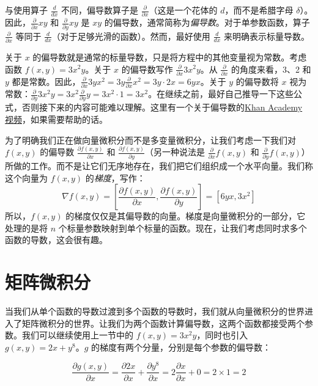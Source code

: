 \documentclass[11pt]{article}
\begin{document}
与使用算子 $\frac{d}{dx}$ 不同，偏导数算子是 $\frac{\partial}{\partial x}$（这是一个花体的 $d$，而不是希腊字母 $\delta$）。因此，$\frac{\partial }{\partial x}xy$ 和 $\frac{\partial }{\partial y}xy$ 是 $xy$ 的偏导数，通常简称为{\em 偏导数}。对于单参数函数，算子 $\frac{\partial}{\partial x}$ 等同于 $\frac{d}{dx}$（对于足够光滑的函数）。然而，最好使用 $\frac{d}{dx}$ 来明确表示标量导数。

关于 $x$ 的偏导数就是通常的标量导数，只是将方程中的其他变量视为常数。考虑函数 $f(x, y) = 3x^2y$。关于 $x$ 的偏导数写作 $\frac{\partial}{\partial x} 3x^2y$。从 $\frac{\partial}{\partial x}$ 的角度来看，3、2 和 $y$ 都是常数。因此，$\frac{\partial}{\partial x} 3yx^2 = 3y \frac{\partial}{\partial x} x^2 = 3y \cdot 2x = 6yx$。关于 $y$ 的偏导数将 $x$ 视为常数：$\frac{\partial}{\partial y} 3x^2y = 3x^2 \frac{\partial}{\partial y} y = 3x^2 \cdot 1 = 3x^2$。在继续之前，最好自己推导一下这些公式，否则接下来的内容可能难以理解。这里有一个关于偏导数的\href{https://www.khanacademy.org/math/multivariable-calculus/multivariable-derivatives/partial-derivative-and-gradient-articles/a/introduction-to-partial-derivatives}{Khan Academy 视频}，如果需要帮助的话。

为了明确我们正在做向量微积分而不是多变量微积分，让我们考虑一下我们对 $f(x, y)$ 的偏导数 $\frac{\partial f(x, y)}{\partial x}$ 和 $\frac{\partial f(x, y)}{\partial y}$（另一种说法是 $\frac{\partial}{\partial x}f(x, y)$ 和 $\frac{\partial }{\partial y}f(x, y)$）所做的工作。而不是让它们无序地存在，我们把它们组织成一个水平向量。我们称这个向量为 $f(x, y)$ 的{\em 梯度}，写作：
\[
\nabla f(x, y) = \left[ \frac{\partial f(x, y)}{\partial x}, \frac{\partial f(x, y)}{\partial y} \right] = [6yx, 3x^2]
\]
所以，$f(x, y)$ 的梯度仅仅是其偏导数的向量。梯度是向量微积分的一部分，它处理的是将 $n$ 个标量参数映射到单个标量的函数。现在，让我们考虑同时求多个函数的导数，这会很有趣。


\section{矩阵微积分}\label{sec4}

当我们从单个函数的导数过渡到多个函数的导数时，我们就从向量微积分的世界进入了矩阵微积分的世界。让我们为两个函数计算偏导数，这两个函数都接受两个参数。我们可以继续使用上一节中的 $f(x, y) = 3x^2y$，同时也引入 $g(x, y) = 2x + y^8$。$g$ 的梯度有两个分量，分别是每个参数的偏导数：

\[
\frac{\partial g(x,y)}{\partial x} = \frac{\partial 2x}{\partial x} + \frac{\partial y^8}{\partial x} = 2\frac{\partial x}{\partial x} + 0 = 2 \times 1 = 2
\]
\end{document}
